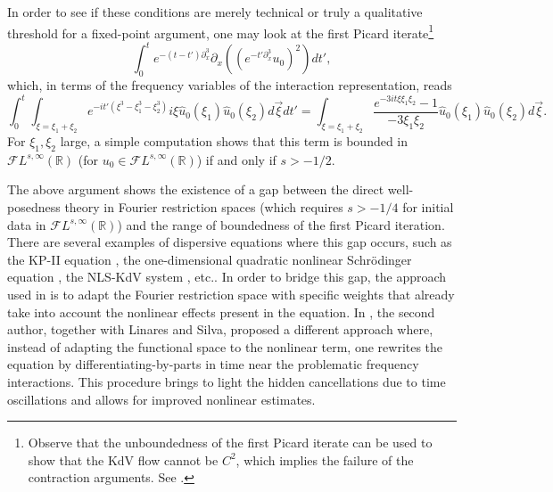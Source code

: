 \documentclass[%
11pt,  reqno]{amsart}
\newcommand{\5}{\textup{V}}
\DeclareMathOperator*{\intt}{\int}
\newcommand{\dx}{\partial_x}
\theoremstyle{remark}
\newcommand{\R}{\mathbb{R}}
\numberwithin{equation}{section}
\numberwithin{theorem}{section}
\begin{document}
	\medskip
	In order to see if these conditions are merely technical or truly a qualitative threshold for a fixed-point argument, one may look at the first Picard iterate\footnote{Observe that the unboundedness of the first Picard iterate can be used to show that the KdV flow cannot be $C^2$, which implies the failure of the contraction arguments. See  \cite{bou_ill_kdv, MolTzeSaut_ill, Tzvetkov_ill}.}
	$$
	\int_0^t e^{-(t-t')\dx^3}\partial_x((e^{-t'\dx^3}u_0)^2)dt',
	$$
	which, in terms of the frequency variables of the interaction representation, reads
	\begin{equation}\label{eq:first_picard}
		\int_0^t \intt_{\xi=\xi_1+\xi_2}e^{-it' (\xi^3 -
			\xi_1^3 - \xi_2^3) } i\xi \widehat{u}_0( \xi_1) \widehat{u}_0(\xi_2) d\vec{\xi} dt' = \intt_{\xi=\xi_1+\xi_2}\frac{e^{-3it\xi\xi_1\xi_2}-1}{-3\xi_1\xi_2} \widehat{u}_0( \xi_1) \widehat{u}_0(\xi_2) d\vec{\xi}.
	\end{equation}
	For $\xi_1, \xi_2$ large, 
	a simple computation shows that this term is bounded in $\mathcal{F}L^{s,\infty}(\R)$ (for $u_0\in \mathcal{F}L^{s,\infty}(\R)$) if and only if $s>-1/2$.
	
	\medskip
	The above argument shows the existence of a gap between the direct well-posedness theory in Fourier restriction spaces (which   requires $s>-1/4$ for initial data in $\mathcal{F}L^{s,\infty}(\R)$) and the range of boundedness of the first Picard iteration. There are several examples of dispersive equations where this gap occurs, such as the KP-II equation \cite{hadac, HHK_kpii}, the one-dimensional quadratic nonlinear Schrödinger equation \cite{taobejenaru, OS12}, the NLS-KdV system \cite{CLS}, etc.. In order to bridge this gap, the approach used in \cite{ taobejenaru, hadac, HHK_kpii} is to adapt the Fourier restriction space with specific weights that already take into account the nonlinear effects present in the equation. In \cite{CLS}, the second author, together with Linares and Silva, proposed a different approach where, instead of adapting the functional space to the nonlinear term, one rewrites the equation by differentiating-by-parts in time near the problematic frequency interactions. This procedure brings to light the hidden cancellations due to time oscillations and allows for improved nonlinear estimates. 
\end{document}
